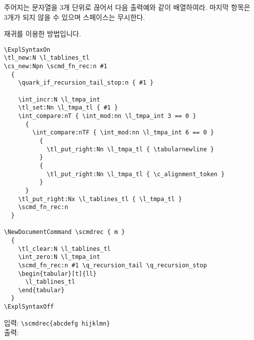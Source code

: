 \documentclass[a4paper,amsmath,itemph]{oblivoir}
\begin{document}
\begin{questiona}{2}
  주어지는 문자열을 3개 단위로 끊어서 다음 출력예와 같이 배열하여라.
  마지막 항목은 3개가 되지 않을 수 있으며 스페이스는 무시한다.

  \tcblower

  재귀를 이용한 방법입니다.
  \begin{verbatim}
\ExplSyntaxOn
\tl_new:N \l_tablines_tl
\cs_new:Npn \scmd_fn_rec:n #1
  {
    \quark_if_recursion_tail_stop:n { #1 }

    \int_incr:N \l_tmpa_int
    \tl_set:Nn \l_tmpa_tl { #1 }
    \int_compare:nT { \int_mod:nn \l_tmpa_int 3 == 0 }
      {
        \int_compare:nTF { \int_mod:nn \l_tmpa_int 6 == 0 }
          {
            \tl_put_right:Nn \l_tmpa_tl { \tabularnewline }
          }
          {
            \tl_put_right:Nn \l_tmpa_tl { \c_alignment_token }
          }
      }
    \tl_put_right:Nx \l_tablines_tl { \l_tmpa_tl }
    \scmd_fn_rec:n
  }

\NewDocumentCommand \scmdrec { m }
  {
    \tl_clear:N \l_tablines_tl
    \int_zero:N \l_tmpa_int
    \scmd_fn_rec:n #1 \q_recursion_tail \q_recursion_stop
    \begin{tabular}[t]{ll}
      \l_tablines_tl
    \end{tabular}
  }
\ExplSyntaxOff
  \end{verbatim}
  \begin{tcolorbox}{}
    입력: \verb|\scmdrec{abcdefg hijklmn}|\\
    출력: 
  \end{tcolorbox}

\end{questiona}
\end{document}
